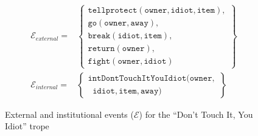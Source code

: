 \documentclass[11pt]{report}
\begin{document}
\begin{figure}[!th]\small
\begin{align}
  \mathcal{E}_{external} = &\left\{\begin{array}{c}
\mathtt{tellprotect(owner, idiot, item)},\\
\mathtt{go(owner, away)},\\
\mathtt{break(idiot, item)},\\
\mathtt{return(owner)},\\
\mathtt{fight(owner, idiot)}
\end{array}
\right\}\label{eq:eobs-hero}\\
  \mathcal{E}_{internal} = &\left\{\begin{array}{l}
\mathtt{intDontTouchItYouIdiot(owner,}\\
\;\;\mathtt{idiot, item, away)}
\end{array}\right\}
\label{eq:einst-hero}
\end{align}
\caption{External and institutional events ($\mathcal{E}$) for the ``Don't Touch
  It, You Idiot'' trope}\label{fig:sausage-events}
\end{figure}
\end{document}
